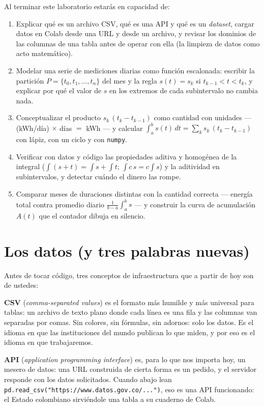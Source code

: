 \documentclass[12pt,letterpaper]{article}
\begin{document}
\begin{cajalogros}
Al terminar este laboratorio estarás en capacidad de:
\begin{enumerate}[label=\arabic*., itemsep=0.1em]
    \item Explicar qué es un archivo CSV, qué es una API y qué es un \emph{dataset}, cargar datos en Colab desde una URL y desde un archivo, y revisar los dominios de las columnas de una tabla antes de operar con ella (la limpieza de datos como acto matemático).
    \item Modelar una serie de mediciones diarias como función escalonada: escribir la partición $P=\{t_0,t_1,\ldots,t_n\}$ del mes y la regla $s(t)=s_k$ si $t_{k-1}<t<t_k$, y explicar por qué el valor de $s$ en los extremos de cada subintervalo no cambia nada.
    \item Conceptualizar el producto $s_k\,(t_k-t_{k-1})$ como cantidad con unidades --- (kWh/día) $\times$ días $=$ kWh --- y calcular $\int_a^b s(t)\,dt=\sum_k s_k\,(t_k-t_{k-1})$ con lápiz, con un ciclo y con \texttt{numpy}.
    \item Verificar con datos y código las propiedades aditiva y homogénea de la integral ($\int(s+t)=\int s+\int t$; $\int c\,s=c\int s$) y la aditividad en subintervalos, y detectar cuándo el dinero las rompe.
    \item Comparar meses de duraciones distintas con la cantidad correcta --- energía total contra promedio diario $\frac{1}{b-a}\int_a^b s$ --- y construir la curva de acumulación $A(t)$ que el contador dibuja en silencio.
\end{enumerate}
\end{cajalogros}

\section{Los datos (y tres palabras nuevas)}
Antes de tocar código, tres conceptos de infraestructura que a partir de hoy son de ustedes:

\textbf{CSV} (\emph{comma-separated values}) es el formato más humilde y más universal para tablas: un archivo de texto plano donde cada línea es una fila y las columnas van separadas por comas. Sin colores, sin fórmulas, sin adornos: solo los datos. Es el idioma en que las instituciones del mundo publican lo que miden, y por eso es el idioma en que trabajaremos.

\textbf{API} (\emph{application programming interface}) es, para lo que nos importa hoy, un mesero de datos: una URL construida de cierta forma es un pedido, y el servidor responde con los datos solicitados. Cuando abajo lean \texttt{pd.read\_csv("https://www.datos.gov.co/...")}, eso es una API funcionando: el Estado colombiano sirviéndole una tabla a su cuaderno de Colab.
\end{document}

